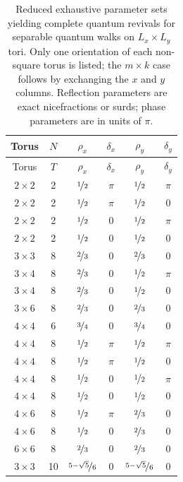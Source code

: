 \documentclass{article}
\begin{document}
\begin{longtable}{cccccc}
\caption{Reduced exhaustive parameter sets yielding complete quantum
revivals for separable quantum walks on $L_x \times L_y$ tori. Only one
orientation of each non-square torus is listed; the $m \times k$ case follows
by exchanging the $x$ and $y$ columns. Reflection parameters are exact
nicefractions or surds; phase parameters are in units of $\pi$.}
\label{tab:revivals-reduced} \\
\toprule
Torus & $N$ & $\rho_x$ & $\delta_x$ & $\rho_y$ & $\delta_y$ \\
\midrule
\endfirsthead
\toprule
Torus & $T$ & $\rho_x$ & $\delta_x$ & $\rho_y$ & $\delta_y$ \\
\midrule
\endhead
\bottomrule
\endfoot


$2 \times 2$ & 2 & $\nicefrac{1}{2}$ & $\pi$ & $\nicefrac{1}{2}$ & $\pi$ \\
$2 \times 2$ & 2 & $\nicefrac{1}{2}$ & $\pi$ & $\nicefrac{1}{2}$ & 0 \\
$2 \times 2$ & 2 & $\nicefrac{1}{2}$ & 0 & $\nicefrac{1}{2}$ & $\pi$ \\
$2 \times 2$ & 2 & $\nicefrac{1}{2}$ & 0 & $\nicefrac{1}{2}$ & 0 \\
$3 \times 3$ & 8 & $\nicefrac{2}{3}$ & 0 & $\nicefrac{2}{3}$ & 0 \\
$3 \times 4$ & 8 & $\nicefrac{2}{3}$ & 0 & $\nicefrac{1}{2}$ & $\pi$ \\
$3 \times 4$ & 8 & $\nicefrac{2}{3}$ & 0 & $\nicefrac{1}{2}$ & 0 \\
$3 \times 6$ & 8 & $\nicefrac{2}{3}$ & 0 & $\nicefrac{2}{3}$ & 0 \\
$4 \times 4$ & 6 & $\nicefrac{3}{4}$ & 0 & $\nicefrac{3}{4}$ & 0 \\
$4 \times 4$ & 8 & $\nicefrac{1}{2}$ & $\pi$ & $\nicefrac{1}{2}$ & $\pi$ \\
$4 \times 4$ & 8 & $\nicefrac{1}{2}$ & $\pi$ & $\nicefrac{1}{2}$ & 0 \\
$4 \times 4$ & 8 & $\nicefrac{1}{2}$ & 0 & $\nicefrac{1}{2}$ & $\pi$ \\
$4 \times 4$ & 8 & $\nicefrac{1}{2}$ & 0 & $\nicefrac{1}{2}$ & 0 \\
$4 \times 6$ & 8 & $\nicefrac{1}{2}$ & $\pi$ & $\nicefrac{2}{3}$ & 0 \\
$4 \times 6$ & 8 & $\nicefrac{1}{2}$ & 0 & $\nicefrac{2}{3}$ & 0 \\
$6 \times 6$ & 8 & $\nicefrac{2}{3}$ & 0 & $\nicefrac{2}{3}$ & 0 \\
$3 \times 3$ & 10 & $\nicefrac{5-\sqrt{5}}{6}$ & 0 & $\nicefrac{5-\sqrt{5}}{6}$ & 0 \\

\end{longtable}
\end{document}
